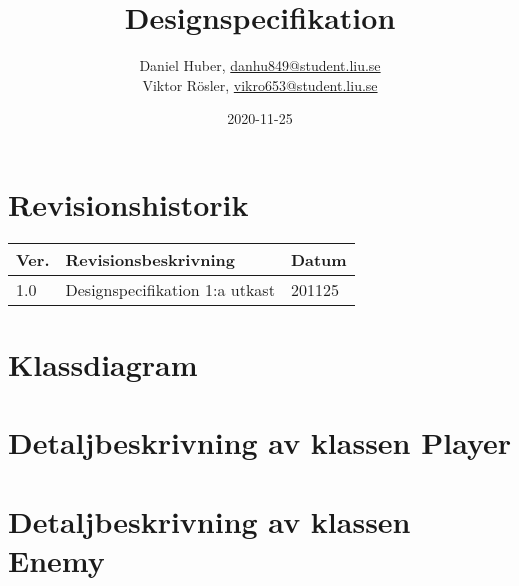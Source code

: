 \documentclass{TDP005mall}
\author{Daniel Huber, \url{danhu849@student.liu.se}\\
  Viktor Rösler, \url{vikro653@student.liu.se}}
\title{Designspecifikation}
\date{2020-11-25}
\begin{document}
\projectpage
\tableofcontents
\newpage
\section{Revisionshistorik}
\begin{table}[!h]
\begin{tabularx}{\linewidth}{|l|X|l|}
\hline
Ver. & Revisionsbeskrivning & Datum \\\hline
1.0 & Designspecifikation 1:a utkast & 201125 \\\hline
\end{tabularx}
\end{table}


\section{Klassdiagram}

\section{Detaljbeskrivning av klassen Player}

\section{Detaljbeskrivning av klassen Enemy}


\end{document}
